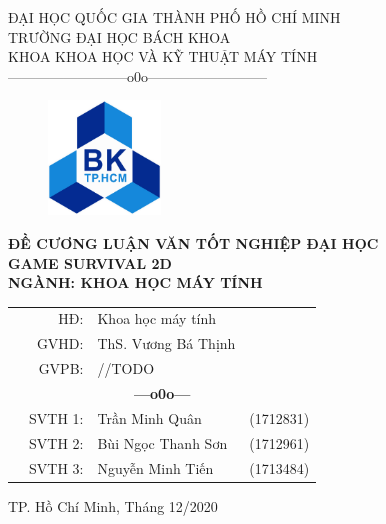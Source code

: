 \documentclass[12pt,a4paper]{article}
\begin{document}
    \begin{titlepage}

        \thisfancypage{%
            \doublebox}{}
        \begin{center}
        {\fontsize{15pt}{15pt}\selectfont
        ĐẠI HỌC QUỐC GIA THÀNH PHỐ HỒ CHÍ MINH\\
        TRƯỜNG ĐẠI HỌC BÁCH KHOA\\
        KHOA KHOA HỌC VÀ KỸ THUẬT MÁY TÍNH\\
        --------------------------o0o--------------------------
        }
        \end{center}
        \vspace{1cm}
        \begin{figure}[h!]
            \centering
            \includegraphics[width=3cm]{Img/LogoBK.jpg}
        \end{figure}
        \vspace{1cm}
        \begin{center}
            \textbf{\fontsize{16pt}{16pt}\selectfont ĐỀ CƯƠNG LUẬN VĂN TỐT NGHIỆP ĐẠI HỌC\\}
            \vspace{1cm}
            \textbf{\fontsize{24pt}{24pt}\selectfont GAME SURVIVAL 2D\\}
            \vspace{1cm}
            \textbf{\fontsize{16pt}{16pt}\selectfont NGÀNH: KHOA HỌC MÁY TÍNH\\}
        \end{center}
        \vspace{4cm}
        \begin{table}[h]
            \centering
            \fontsize{15pt}{15pt}\selectfont
            \begin{tabular}{rrll}
                & HĐ:     & Khoa học máy tính   &           \\
                & GVHD:   & ThS. Vương Bá Thịnh &           \\
                & GVPB: & //TODO \\
                \multicolumn{4}{c}{\textbf{---o0o---}} \\
                & SVTH 1: & Trần Minh Quân      & (1712831) \\
                & SVTH 2: & Bùi Ngọc Thanh Sơn  & (1712961) \\
                & SVTH 3: & Nguyễn Minh Tiến    & (1713484) \\
            \end{tabular}
        \end{table}
        \vspace{2cm}
        \begin{center}
        {\fontsize{15pt}{15pt}\selectfont TP. Hồ Chí Minh, Tháng 12/2020}
        \end{center}
    \end{titlepage}
\end{document}
